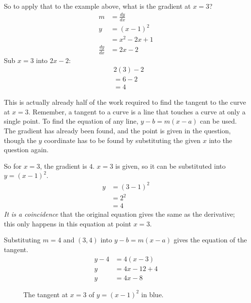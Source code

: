 So to apply that to the example above, what is the gradient at $x=3$?
\begin{align*}
	m &= \frac{dy}{dx}\\
	y &= (x-1)^2\\
	&= x^2-2x+1\\
	\frac{dy}{dx} &= 2x-2
\end{align*}
Sub $x=3$ into $2x-2$:
\begin{align*}
	&2(3)-2\\
	&=6-2\\
	&=4
\end{align*}

This is actually already half of the work required to find the tangent to the curve at $x=3$. Remember, a tangent to a curve is a line that touches a curve at only a single point. To find the equation of any line, $y-b=m(x-a)$ can be used. The gradient has already been found, and the point is given in the question, though the $y$ coordinate has to be found by substituting the given $x$ into the question again.

So for $x=3$, the gradient is $4$. $x=3$ is given, so it can be substituted into $y=(x-1)^2$.
\begin{align*}
	y&=(3-1)^2\\
	&=2^2\\
	&=4
\end{align*}
\textit{It is a coincidence} that the original equation gives the same as the derivative; this only happens in this equation at point $x=3$.

Substituting $m=4$ and $(3,4)$ into $y-b=m(x-a)$ gives the equation of the tangent.
\begin{align*}
	y-4&=4(x-3)\\
	y&=4x-12+4\\
	y&=4x-8
\end{align*}

\begin{figure}[h!]
	\centering
	\caption{The tangent at $x=3$ of $y=(x-1)^2$ in blue.}
	\label{fig:gradientFinishedExample}
\end{figure}

